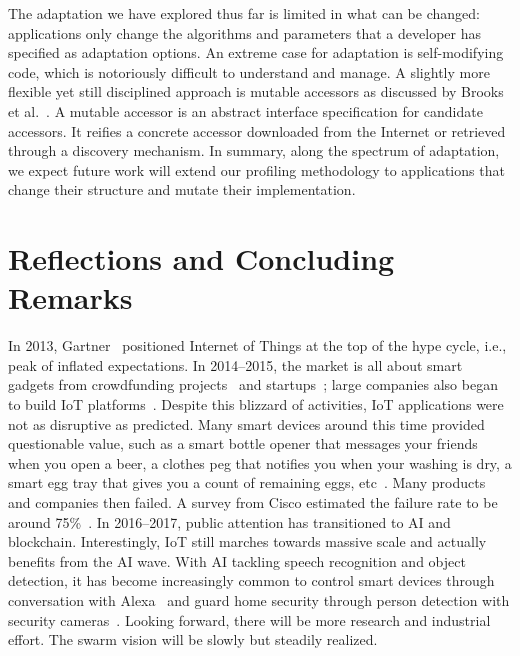 \documentclass[thesis.tex]{subfiles}
\begin{document}
 The adaptation we have explored thus far is
limited in what can be changed: applications only change the algorithms and
parameters that a developer has specified as adaptation options. An extreme case
for adaptation is self-modifying code, which is notoriously difficult to
understand and manage. A slightly more flexible yet still disciplined approach
is mutable accessors as discussed by Brooks et al.~\cite{brooks2018component}. A
mutable accessor is an abstract interface specification for candidate
accessors. It reifies a concrete accessor downloaded from the Internet or
retrieved through a discovery mechanism. In summary, along the spectrum of
adaptation, we expect future work will extend our profiling methodology to
applications that change their structure and mutate their implementation.

\section{Reflections and Concluding Remarks}
\label{sec:conclusions}

In 2013, Gartner~\cite{middleton2013forecast} positioned Internet of Things at
the top of the hype cycle, i.e., peak of inflated expectations. In 2014--2015,
the market is all about smart gadgets from crowdfunding
projects~\cite{kickstarter} and startups~\cite{fitbit}; large companies also
began to build IoT platforms~\cite{sami, awsiot}. Despite this blizzard of
activities, IoT applications were not as disruptive as predicted. Many smart
devices around this time provided questionable value, such as a smart bottle
opener that messages your friends when you open a beer, a clothes peg that
notifies you when your washing is dry, a smart egg tray that gives you a count
of remaining eggs, etc~\cite{hartmann2016societal}. Many products and companies
then failed. A survey from Cisco estimated the failure rate to be around
75\%~\cite{cisco2017journey}. In 2016--2017, public attention has transitioned
to AI and blockchain. Interestingly, IoT still marches towards massive scale and
actually benefits from the AI wave. With AI tackling speech recognition and
object detection, it has become increasingly common to control smart devices
through conversation with Alexa~\cite{alexa} and guard home security through
person detection with security cameras~\cite{dropcam}. Looking forward, there
will be more research and industrial effort. The swarm vision will be slowly but
steadily realized.
\end{document}
